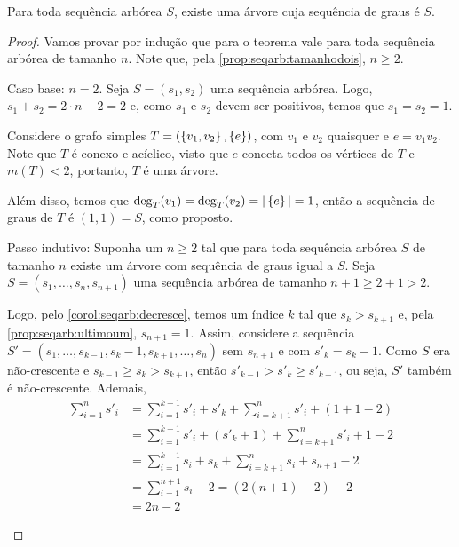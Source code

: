\begin{lemma}
    Para toda sequência arbórea $S$, existe uma árvore cuja sequência de graus é $S$.
\end{lemma}

\enlargethispage{1em}
\begin{proof}
    Vamos provar por indução que para o teorema vale para toda sequência arbórea de tamanho $n$. Note que, pela \cref{prop:seqarb:tamanhodois}, $n \geq 2$.

    \begin{ncasos}
        \item[Caso base:] $n = 2$. Seja $S = (s_1, s_2)$ uma sequência arbórea. Logo, $s_1 + s_2 = 2 \cdot n - 2 = 2$ e, como $s_1$ e $s_2$ devem ser positivos, temos que $s_1 = s_2 = 1$.

        Considere o grafo simples $T = (\set{v_1, v_2}, \set{e})$, com $v_1$ e $v_2$ quaisquer e $e = v_1 v_2$. Note que $T$ é conexo e acíclico, visto que $e$ conecta todos os vértices de $T$ e $m(T) < 2$, portanto, $T$ é uma árvore.

        Além disso, temos que $\grau_T(v_1) = \grau_T(v_2) = \abs{\set{e}} = 1$, então a sequência de graus de $T$ é $(1, 1) = S$, como proposto.

        \item[Passo indutivo:] Suponha um $n \geq 2$ tal que para toda  sequência arbórea $S$ de tamanho $n$ existe um árvore com sequência de graus igual a $S$. Seja $S = (s_1, \ldots, s_n, s_{n+1})$ uma sequência arbórea de tamanho $n + 1 \geq 2 + 1 > 2$.

        Logo, pelo \cref{corol:seqarb:decresce}, temos um índice $k$ tal que $s_k > s_{k + 1}$ e, pela \cref{prop:seqarb:ultimoum}, $s_{n + 1} = 1$. Assim, considere a sequência $S' = (s_1, \ldots, s_{k - 1}, s_k - 1, s_{k + 1}, \ldots, s_n)$ sem $s_{n + 1}$ e com $s'_k = s_k - 1$. Como $S$ era não-crescente e $s_{k - 1} \geq s_k > s_{k + 1}$, então $s'_{k - 1} > s'_k \geq s'_{k + 1}$, ou seja, $S'$ também é não-crescente. Ademais,
        \begin{align*}
            \sum_{i = 1}^n s'_i &= \sum_{i = 1}^{k - 1} s'_i + s'_k + \sum_{i = k + 1}^n s'_i + (1 + 1 - 2) \\
            &= \sum_{i = 1}^{k - 1} s'_i + \left(s'_k + 1\right) + \sum_{i = k + 1}^n s'_i + 1 - 2 \\
            &= \sum_{i = 1}^{k - 1} s_i + s_k + \sum_{i = k + 1}^n s_i + s_{n + 1} - 2 \\
            &= \sum_{i = 1}^{n + 1} s_i - 2
            = (2 (n + 1) - 2) - 2 \\
            &= 2 n - 2
        \end{align*}


\end{ncasos}
\end{proof}
